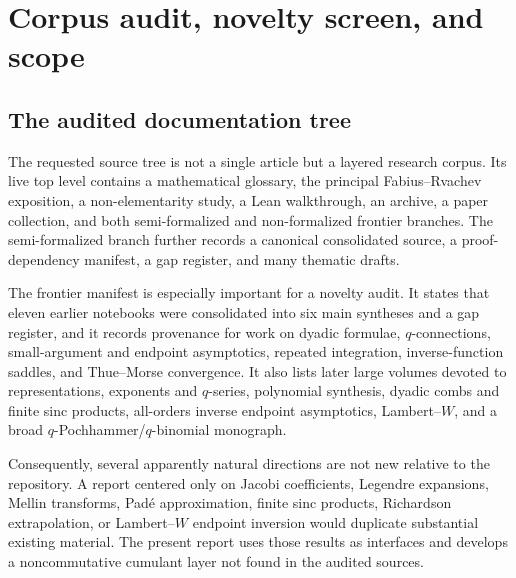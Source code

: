 \documentclass[11pt]{article}
\theoremstyle{definition}
\begin{document}
\tableofcontents
\newpage

\section{Corpus audit, novelty screen, and scope}
\subsection{The audited documentation tree}
The requested source tree is not a single article but a layered research corpus. Its live top level contains a mathematical glossary, the principal Fabius--Rvachev exposition, a non-elementarity study, a Lean walkthrough, an archive, a paper collection, and both semi-formalized and non-formalized frontier branches. The semi-formalized branch further records a canonical consolidated source, a proof-dependency manifest, a gap register, and many thematic drafts.

The frontier manifest is especially important for a novelty audit. It states that eleven earlier notebooks were consolidated into six main syntheses and a gap register, and it records provenance for work on dyadic formulae, \(q\)-connections, small-argument and endpoint asymptotics, repeated integration, inverse-function saddles, and Thue--Morse convergence. It also lists later large volumes devoted to representations, exponents and \(q\)-series, polynomial synthesis, dyadic combs and finite sinc products, all-orders inverse endpoint asymptotics, Lambert--\(W\), and a broad \(q\)-Pochhammer/\(q\)-binomial monograph.

Consequently, several apparently natural directions are not new relative to the repository. A report centered only on Jacobi coefficients, Legendre expansions, Mellin transforms, Pad\'e approximation, finite sinc products, Richardson extrapolation, or Lambert--\(W\) endpoint inversion would duplicate substantial existing material. The present report uses those results as interfaces and develops a noncommutative cumulant layer not found in the audited sources.
\end{document}
